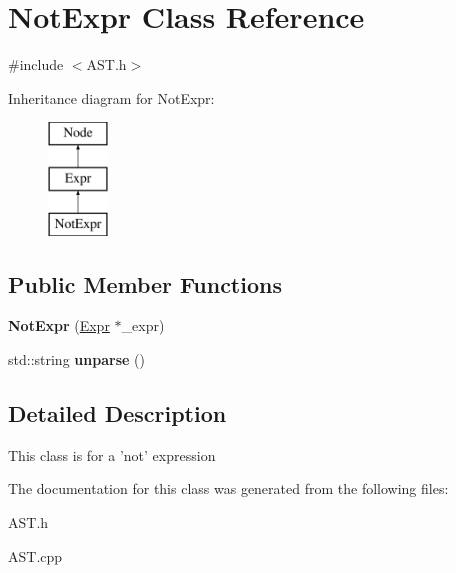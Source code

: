 \hypertarget{classNotExpr}{\section{Not\-Expr Class Reference}
\label{classNotExpr}
}


{\ttfamily \#include $<$A\-S\-T.\-h$>$}

Inheritance diagram for Not\-Expr\-:\begin{figure}[H]
\begin{center}
\leavevmode
\includegraphics[height=3.000000cm]{classNotExpr}
\end{center}
\end{figure}
\subsection*{Public Member Functions}
\begin{DoxyCompactItemize}
\item 
\hypertarget{classNotExpr_a32d8529fc0f1e411b6a652a372202c7a}{{\bfseries Not\-Expr} (\hyperlink{classExpr}{Expr} $\ast$\-\_\-expr)}\label{classNotExpr_a32d8529fc0f1e411b6a652a372202c7a}

\item 
\hypertarget{classNotExpr_ab49f96d8f23e3fa6bb21376dc0fa5215}{std\-::string {\bfseries unparse} ()}\label{classNotExpr_ab49f96d8f23e3fa6bb21376dc0fa5215}

\end{DoxyCompactItemize}


\subsection{Detailed Description}
This class is for a 'not' expression 

The documentation for this class was generated from the following files\-:\begin{DoxyCompactItemize}
\item 
A\-S\-T.\-h\item 
A\-S\-T.\-cpp\end{DoxyCompactItemize}
